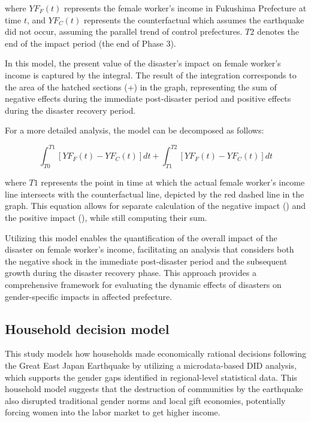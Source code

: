 \documentclass[a4paper,12pt]{article}
\begin{document}
where $YF_F(t)$ represents the female worker's income in Fukushima Prefecture at time $t$, and $YF_C(t)$ represents the counterfactual which assumes the earthquake did not occur, assuming the parallel trend of control prefectures. $T2$ denotes the end of the impact period (the end of Phase 3).

In this model, the present value of the disaster's impact on female worker's income is captured by the integral. The result of the integration corresponds to the area of the hatched sections (+) in the graph, representing the sum of negative effects during the immediate post-disaster period and positive effects during the disaster recovery period.

For a more detailed analysis, the model can be decomposed as follows:

\begin{equation}
\int_{T0}^{T1} [YF_F(t) - YF_C(t)] dt + \int_{T1}^{T2} [YF_F(t) - YF_C(t)] dt
\end{equation}

where $T1$ represents the point in time at which the actual female worker's income line intersects with the counterfactual line, depicted by the red dashed line in the graph. This equation allows for separate calculation of the negative impact () and the positive impact (), while still computing their sum.

Utilizing this model enables the quantification of the overall impact of the disaster on female worker's income, facilitating an analysis that considers both the negative shock in the immediate post-disaster period and the subsequent growth during the disaster recovery phase. This approach provides a comprehensive framework for evaluating the dynamic effects of disasters on gender-specific impacts in affected prefecture.


\subsection{Household decision model}
\label{sec5.1}

This study models how households made economically rational decisions following the Great East Japan Earthquake by utilizing a microdata-based DID analysis, which supports the gender gaps identified in regional-level statistical data. This household model suggests that the destruction of communities by the earthquake also disrupted traditional gender norms and local gift economies, potentially forcing women into the labor market to get higher income.
\end{document}
